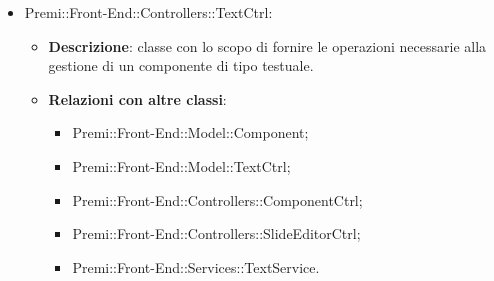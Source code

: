 \begin{itemize}
	\item  Premi::Front-End::Controllers::TextCtrl:
			\begin{itemize}
				\item \textbf{Descrizione}: classe con lo scopo di fornire le operazioni necessarie alla gestione di un componente di tipo testuale.
				\item \textbf{Relazioni con altre classi}:
					\begin{itemize}
						\item Premi::Front-End::Model::Component;
						\item Premi::Front-End::Model::TextCtrl;
						\item Premi::Front-End::Controllers::ComponentCtrl;
						\item Premi::Front-End::Controllers::SlideEditorCtrl;
						\item Premi::Front-End::Services::TextService.
					\end{itemize}
			\end{itemize}
	
	
	
	
	
	
	
	
	
	
	
	
	
	
	

\end{itemize}
